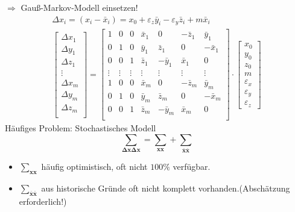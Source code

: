 \documentclass[12pt]{article}
\begin{document}
$\Longrightarrow$ Gauß-Markov-Modell einsetzen!
\begin{gather*}
\Delta x_i = (x_i - \bar{x}_i) = x_0 + \varepsilon_z \bar{y}_i - \varepsilon_y \bar{z}_i + m \bar{x}_i \\
\begin{bmatrix}
\Delta x_1 \\
\Delta y_1 \\
\Delta z_1 \\
\vdots \\
\Delta x_m \\
\Delta y_m \\
\Delta z_m \\
\end{bmatrix} = \begin{bmatrix}
1 & 0 & 0 & \bar{x}_1 & 0 & -\bar{z}_1 & \bar{y}_1 \\
0 & 1 & 0 & \bar{y}_1 & \bar{z}_1 & 0 & -\bar{x}_1 \\
0 & 0 & 1 & \bar{z}_1 & -\bar{y}_1 & \bar{x}_1 & 0 \\
\vdots & \vdots & \vdots & \vdots & \vdots & \vdots & \vdots \\
1 & 0 & 0 & \bar{x}_m & 0 & -\bar{z}_m & \bar{y}_m \\
0 & 1 & 0 & \bar{y}_m & \bar{z}_m & 0 & -\bar{x}_m \\
0 & 0 & 1 & \bar{z}_m & -\bar{y}_m & \bar{x}_m & 0 \\
\end{bmatrix} \cdot \begin{bmatrix}
x_0 \\
y_0 \\
z_0 \\
m \\
\varepsilon_x \\
\varepsilon_y \\
\varepsilon_z
\end{bmatrix}
\end{gather*}
Häufiges Problem: \newline
Stochastisches Modell
\begin{equation*}
\bm{\sum_{\Delta x \Delta x}} = \bm{\sum_{xx}} + \bm{\sum_{\bar{x} \bar{x}}}
\end{equation*}
\begin{itemize}
\item $\bm{\sum_{xx}}$ häufig optimistisch, oft nicht $100 \%$ verfügbar.
\item $\bm{\sum_{\bar{x} \bar{x}}}$ aus historische Gründe oft nicht komplett vorhanden.(Abschätzung erforderlich!)
\end{itemize}
\end{document}
